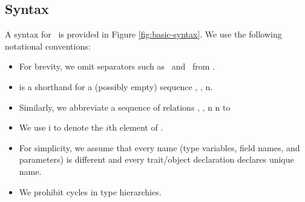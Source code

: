 %
%
%
%

\subsection{Syntax}\label{basic-syntax}

A syntax for \basiccore\ is provided in Figure \ref{fig:basic-syntax}.
We use the following notational conventions:
\begin{itemize}
\item For brevity, we omit separators such as \comma\ and \semicolon\ from
  \basiccore.

\item \seq{\ty} is a shorthand for a (possibly empty) sequence ,
 \more, \tyn n.

\item Similarly, we abbreviate a sequence of relations
 \sub{} \extends \sub{}, \more,
 \sub\tvone n \extends \sub\tappone n to
 \seq{\tvone \extends \tappone}

\item We use \tyn i to denote the $i$th element of \seq\ty.

\item For simplicity, we assume that every name (type variables,
  field names, and parameters) is different and every trait/object
  declaration declares unique name.

\item We prohibit cycles in type hierarchies.

\end{itemize}

